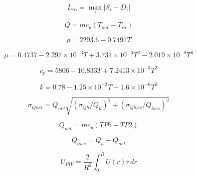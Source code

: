 \[
L_\infty=\max_i\lvert S_i-D_i\rvert
\]

\[
Q=\dot m c_p(T_{out}-T_{in})
\]

\[
\rho=2293.6-0.7497T
\]

\[
\mu=0.4737-2.297\times10^{-3}T+3.731\times10^{-6}T^2-2.019\times10^{-9}T^3
\]

\[
c_p=5806-10.833T+7.2413\times10^{-3}T^2
\]

\[
k=0.78-1.25\times10^{-3}T+1.6\times10^{-6}T^2
\]

\[
\sigma_{Qnet}=Q_{net}\sqrt{(\sigma_{Qh}/Q_h)^2+(\sigma_{Qloss}/Q_{loss})^2}
\]

\[
Q_{net}=\dot m c_p(TP6-TP2)
\]

\[
Q_{loss}=Q_h-Q_{net}
\]

\[
U_{PIV}=\frac{2}{R^2}\int_0^R U(r)r\,dr
\]

